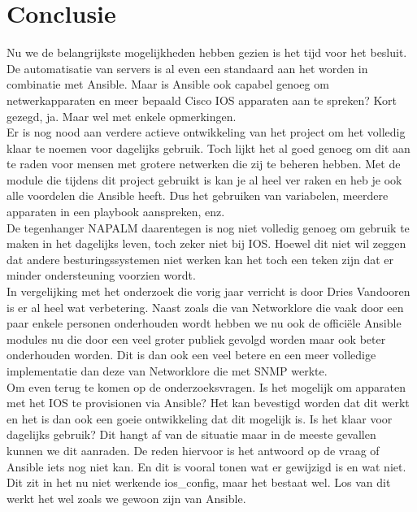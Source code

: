 
\chapter{Conclusie}
\label{ch:conclusie}

Nu we de belangrijkste mogelijkheden hebben gezien is het tijd voor het besluit. De automatisatie van servers is al even een standaard aan het worden in combinatie met Ansible. Maar is Ansible ook capabel genoeg om netwerkapparaten en meer bepaald Cisco IOS apparaten aan te spreken? Kort gezegd, ja. Maar wel met enkele opmerkingen.
\\

Er is nog nood aan verdere actieve ontwikkeling van het project om het volledig klaar te noemen voor dagelijks gebruik. Toch lijkt het al goed genoeg om dit aan te raden voor mensen met grotere netwerken die zij te beheren hebben. Met de module die tijdens dit project gebruikt is kan je al heel ver raken en heb je ook alle voordelen die Ansible heeft. Dus het gebruiken van variabelen, meerdere apparaten in een playbook aanspreken, enz.
\\

De tegenhanger NAPALM daarentegen is nog niet volledig genoeg om gebruik te maken in het dagelijks leven, toch zeker niet bij IOS. Hoewel dit niet wil zeggen dat andere besturingssystemen niet werken kan het toch een teken zijn dat er minder ondersteuning voorzien wordt.
\\

In vergelijking met het onderzoek die vorig jaar verricht is door Dries Vandooren is er al heel wat verbetering. Naast zoals die van Networklore die vaak door een paar enkele personen onderhouden wordt hebben we nu ook de officiële Ansible modules nu die door een veel groter publiek gevolgd worden maar ook beter onderhouden worden. Dit is dan ook een veel betere en een meer volledige implementatie dan deze van Networklore die met SNMP werkte.
\\  

Om even terug te komen op de onderzoeksvragen. Is het mogelijk om apparaten met het IOS te provisionen via Ansible? Het kan bevestigd worden dat dit werkt en het is dan ook een goeie ontwikkeling dat dit mogelijk is. Is het klaar voor dagelijks gebruik? Dit hangt af van de situatie maar in de meeste gevallen kunnen we dit aanraden. De reden hiervoor is het antwoord op de vraag of Ansible iets nog niet kan. En dit is vooral tonen wat er gewijzigd is en wat niet. Dit zit in het nu niet werkende ios\_config, maar het bestaat wel. Los van dit werkt het wel zoals we gewoon zijn van Ansible.
\\

